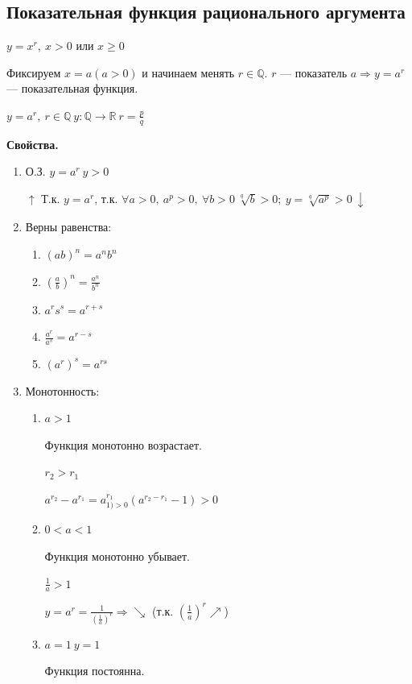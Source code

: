 \documentclass{article}
\begin{document}
    \subsection{Показательная функция рационального аргумента}

    \( y = x^r,\ x > 0 \textrm{ или } x \geq 0\)

    Фиксируем \( x = a (a > 0)\) и начинаем менять \(r \in \mathbb{Q}\). \(r\) --- показатель \(a \Rightarrow y = a^r\) --- показательная функция.

    \(y = a^r,\ r \in \mathbb{Q}\ y: \mathbb{Q} \rightarrow \mathbb{R}\ r = \frac{p}{q}\)

    \textbf{Свойства.}
    
    \begin{enumerate}
        \item О.З. \(y = a^r\ y > 0\)
        
        \(\uparrow\) Т.к. \(y=a^r\), т.к. \(\forall a > 0,\ a^p > 0,\ \forall b > 0\ \sqrt[q]{b} > 0;\ y = \sqrt[q]{a^p} > 0\ \downarrow\)
        
        \item Верны равенства:
        \begin{enumerate}
            \item \( (ab)^n = a^nb^n \)
            \item \( (\frac{a}{b})^n = \frac{a^n}{b^n} \)
            \item \( a^rs^s = a^{r+s} \)
            \item \( \frac{a^r}{a^s} = a^{r-s} \)
            \item \( (a^r)^s = a^{rs} \)
        \end{enumerate}
        \item Монотонность:
        \begin{enumerate}
            \item \(a > 1\)

            Функция монотонно возрастает.
            
            \(r_2 > r_1\)

            \(a^{r_2} - a^{r_1} = a^{r_1}_{1) > 0}(a^{r_2-r_1} - 1) > 0\)
            
            \item \( 0 < a < 1 \)
            
            Функция монотонно убывает.

            \( \frac{1}{a} > 1\)

            \( y = a^r = \frac{1}{(\frac{1}{a})^r} \Rightarrow \searrow\) (т.к. \((\frac{1}{a})^r \nearrow \))

            \item \(a = 1\ y = 1\)
            
            Функция постоянна.
        \end{enumerate}
    \end{enumerate}
    
\end{document}
